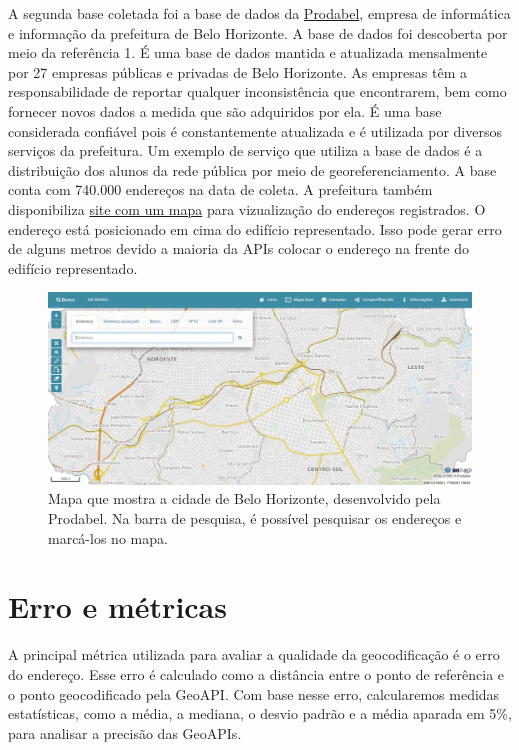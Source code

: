 A segunda base coletada foi a base de dados da \href{https://prefeitura.pbh.gov.br/prodabel}{Prodabel}, empresa de informática e informação da prefeitura de Belo Horizonte. A base de dados foi descoberta por meio da referência 1. É uma base de dados mantida e atualizada mensalmente por 27 empresas públicas e privadas de Belo Horizonte. As empresas têm a responsabilidade de reportar qualquer inconsistência que encontrarem, bem como fornecer novos dados a medida que são adquiridos por ela. É uma base considerada confiável pois é constantemente atualizada e é utilizada por diversos serviços da prefeitura. Um exemplo de serviço que utiliza a base de dados é a distribuição dos alunos da rede pública por meio de georeferenciamento. A base conta com 740.000 endereços na data de coleta. A prefeitura também disponibiliza \href{https://bhmap.pbh.gov.br}{site com um mapa} para vizualização do endereços registrados. O endereço está posicionado em cima do edifício representado. Isso pode gerar erro de alguns metros devido a maioria da APIs colocar o endereço na frente do edifício representado. 

\begin{figure}
    \centering
    \includegraphics[width=\textwidth]{Figuras/siteProdabel.jpeg}
    \caption{Mapa que mostra a cidade de Belo Horizonte, desenvolvido pela Prodabel. Na barra de pesquisa, é possível pesquisar os endereços e marcá-los no mapa.}
    \label{fig:siteProdabel}
\end{figure}


\section{Erro e métricas}

A principal métrica utilizada para avaliar a qualidade da geocodificação é o erro do endereço. Esse erro é calculado como a distância entre o ponto de referência e o ponto geocodificado pela GeoAPI. Com base nesse erro, calcularemos medidas estatísticas, como a média, a mediana, o desvio padrão e a média aparada em 5\%, para analisar a precisão das GeoAPIs.

